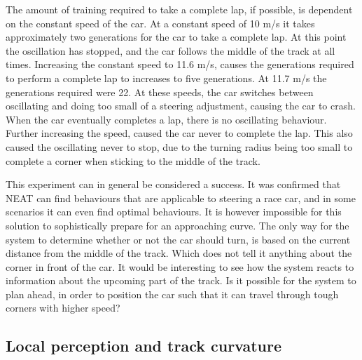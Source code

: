 The amount of training required to take a complete lap, if possible, is dependent on the constant speed of the car. At a constant speed of 10 m/s it takes approximately two generations for the car to take a complete lap. At this point the oscillation has stopped, and the car follows the middle of the track at all times. Increasing the constant speed to 11.6 m/s, causes the generations required to perform a complete lap to increases to five generations. At 11.7 m/s the generations required were 22. At these speeds, the car switches between oscillating and doing too small of a steering adjustment, causing the car to crash. When the car eventually completes a lap, there is no oscillating behaviour. Further increasing the speed, caused the car never to complete the lap. This also caused the oscillating never to stop, due to the turning radius being too small to complete a corner when sticking to the middle of the track.


This experiment can in general be considered a success. It was confirmed that NEAT can find behaviours that are applicable to steering a race car, and in some scenarios it can even find optimal behaviours. It is however impossible for this solution to sophistically prepare for an approaching curve. The only way for the system to determine whether or not the car should turn, is based on the current distance from the middle of the track. Which does not tell it anything about the corner in front of the car. It would be interesting to see how the system reacts to information about the upcoming part of the track. Is it possible for the system to plan ahead, in order to position the car such that it can travel through tough corners with higher speed?

\subsection{Local perception and track curvature}
\label{subsec:fixedspeedcurvature}



